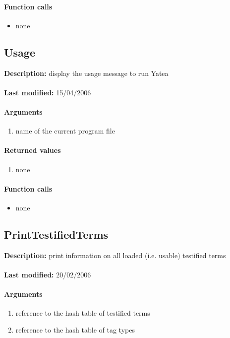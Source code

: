 \paragraph{Function calls}
\begin{itemize}
\item none
\end{itemize}

\subsection{Usage}
\textbf{Description:} display the usage message to run Yatea\\
\\\textbf{Last modified:} 15/04/2006

\paragraph{Arguments}
\begin{enumerate}
\item name of the current program file
\end{enumerate}

\paragraph{Returned values}
\begin{enumerate}
\item none
\end{enumerate}

\paragraph{Function calls}
\begin{itemize}
\item none
\end{itemize}

\subsection{PrintTestifiedTerms}
\textbf{Description:} print information on all loaded (i.e. usable) testified terms\\
\\\textbf{Last modified:} 20/02/2006

\paragraph{Arguments}
\begin{enumerate}
\item reference to the hash table of testified terms
\item reference to the hash table of tag types
\end{enumerate}


